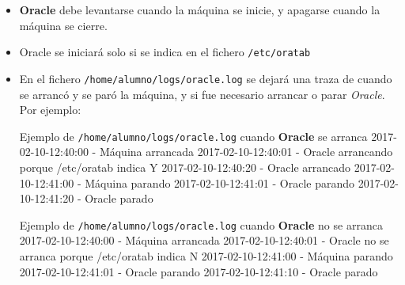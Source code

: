 \begin{homeworkProblem}

  \begin{itemize}
  \item \textbf{Oracle} debe levantarse cuando la máquina se inicie, y apagarse cuando la máquina se cierre.
  \item Oracle se iniciará solo si se indica en el fichero \texttt{/etc/oratab}
  
  \item En el fichero \texttt{/home/alumno/logs/oracle.log} se dejará una traza de cuando se arrancó y se paró la máquina, y si fue necesario arrancar o parar \textit{Oracle}. Por ejemplo:
    \begin{listadotxt}{Ejemplo de \texttt{/home/alumno/logs/oracle.log} cuando \textbf{Oracle} se arranca}
      2017-02-10-12:40:00 - Máquina arrancada
      2017-02-10-12:40:01 - Oracle arrancando porque /etc/oratab indica Y
      2017-02-10-12:40:20 - Oracle arrancado
      2017-02-10-12:41:00 - Máquina parando
      2017-02-10-12:41:01 - Oracle parando
      2017-02-10-12:41:20 - Oracle parado
    \end{listadotxt}

    \begin{listadotxt}{Ejemplo de \texttt{/home/alumno/logs/oracle.log} cuando \textbf{Oracle} no se arranca}
      2017-02-10-12:40:00 - Máquina arrancada
      2017-02-10-12:40:01 - Oracle no se arranca porque /etc/oratab indica N
      2017-02-10-12:41:00 - Máquina parando
      2017-02-10-12:41:01 - Oracle parando
      2017-02-10-12:41:10 - Oracle parado
    \end{listadotxt}

    
  \end{itemize}
  
\end{homeworkProblem}


